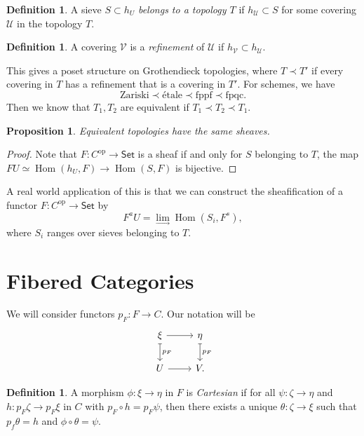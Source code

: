 \documentclass[leqno, openany]{memoir}
\newtheorem{prop}[thm]{Proposition}
\theoremstyle{definition}
\newtheorem{defn}[thm]{Definition}
\theoremstyle{remark}
\theoremstyle{plain}
\theoremstyle{definition}
\theoremstyle{remark}
\newcommand{\mc}[1]{\mathcal{#1}}
\newcommand{\mr}[1]{\mathrm{#1}}
\newcommand{\ms}[1]{\mathsf{#1}}
\DeclareMathOperator{\Hom}{Hom}
\begin{document}
\begin{defn} A sieve $S \subset h_U$ \textit{belongs to a topology $T$} if
$h_{\mc{U}} \subset S$ for some covering $\mc{U}$ in the topology $T$.
\end{defn}

\begin{defn} A covering $\mc{V}$ is a \textit{refinement} of $\mc{U}$ if
$h_{\mc{V}} \subset h_{\mc{U}}$.  \end{defn}

This gives a poset structure on Grothendieck topologies, where $T \prec T'$ if
every covering in $T$ has a refinement that is a covering in $T'$. For schemes,
we have \[ \text{Zariski} \prec \text{\'etale} \prec \text{fppf} \prec
\text{fpqc}. \] Then we know that $T_1, T_2$ are equivalent if $T_1 \prec T_2
\prec T_1$.

\begin{prop} Equivalent topologies have the same sheaves.  \end{prop}

\begin{proof} Note that $F \colon C^{\mr{op}} \to \ms{Set}$ is a sheaf if and
only for $S$ belonging to $T$, the map $FU \simeq \Hom(h_U,F) \to \Hom(S,F)$ is
bijective.  \end{proof}

A real world application of this is that we can construct the sheafification of
a functor $F \colon C^{\mr{op}} \to \ms{Set}$ by \[ F^a U = \lim_{\to}
\Hom(S_i, F^s), \] where $S_i$ ranges over sieves belonging to $T$.

\section{Fibered Categories}%

We will consider functors $p_F \colon F \to C$. Our notation will be
\begin{equation*} \begin{tikzcd} \xi \arrow{r} \arrow[mapsto]{d}{p_F} & \eta
\arrow[mapsto]{d}{p_F} \\ U \arrow{r} & V.  \end{tikzcd} \end{equation*}

\begin{defn} A morphism $\phi \colon \xi \to \eta$ in $F$ is \textit{Cartesian}
    if for all $\psi \colon \zeta \to \eta$ and $h \colon p_F \zeta \to p_F
    \xi$ in $C$ with $p_F \circ h = p_F \psi$, then there exists a unique
    $\theta \colon \zeta \to \xi$ such that $p_f \theta = h$ and $\phi \circ
    \theta = \psi$.  \end{defn}
\end{document}
